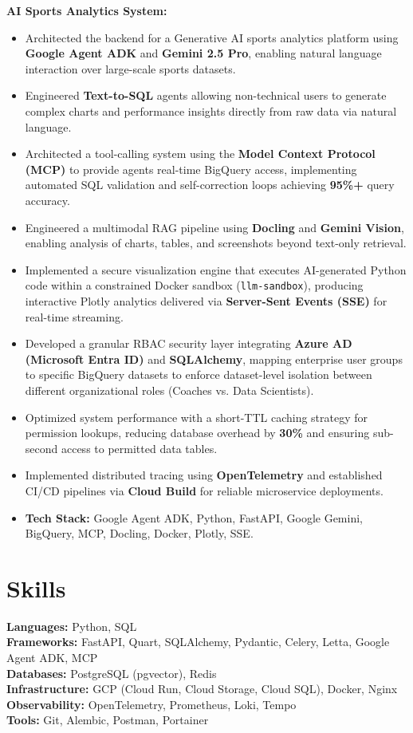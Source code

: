 \documentclass[a4paper,10pt]{article}
\begin{document}
\textbf{AI Sports Analytics System:}
\vspace{0.1cm}
\begin{itemize}[noitemsep,topsep=0pt,leftmargin=*]
    \item Architected the backend for a Generative AI sports analytics platform using \textbf{Google Agent ADK} and \textbf{Gemini 2.5 Pro}, enabling natural language interaction over large-scale sports datasets.
    \item Engineered \textbf{Text-to-SQL} agents allowing non-technical users to generate complex charts and performance insights directly from raw data via natural language.
    \item Architected a tool-calling system using the \textbf{Model Context Protocol (MCP)} to provide agents real-time BigQuery access, implementing automated SQL validation and self-correction loops achieving \textbf{95\%+} query accuracy.
    \item Engineered a multimodal RAG pipeline using \textbf{Docling} and \textbf{Gemini Vision}, enabling analysis of charts, tables, and screenshots beyond text-only retrieval.
    \item Implemented a secure visualization engine that executes AI-generated Python code within a constrained Docker sandbox (\texttt{llm-sandbox}), producing interactive Plotly analytics delivered via \textbf{Server-Sent Events (SSE)} for real-time streaming.
    \item Developed a granular RBAC security layer integrating \textbf{Azure AD (Microsoft Entra ID)} and \textbf{SQLAlchemy}, mapping enterprise user groups to specific BigQuery datasets to enforce dataset-level isolation between different organizational roles (Coaches vs. Data Scientists).
    \item Optimized system performance with a short-TTL caching strategy for permission lookups, reducing database overhead by \textbf{30\%} and ensuring sub-second access to permitted data tables.
    \item Implemented distributed tracing using \textbf{OpenTelemetry} and established CI/CD pipelines via \textbf{Cloud Build} for reliable microservice deployments.
    \item \textbf{Tech Stack:} Google Agent ADK, Python, FastAPI, Google Gemini, BigQuery, MCP, Docling, Docker, Plotly, SSE.
\end{itemize}

\section*{Skills}
\textbf{Languages:} Python, SQL \\
\textbf{Frameworks:} FastAPI, Quart, SQLAlchemy, Pydantic, Celery, Letta, Google Agent ADK, MCP \\
\textbf{Databases:} PostgreSQL (pgvector), Redis \\
\textbf{Infrastructure:} GCP (Cloud Run, Cloud Storage, Cloud SQL), Docker, Nginx \\
\textbf{Observability:} OpenTelemetry, Prometheus, Loki, Tempo \\
\textbf{Tools:} Git, Alembic, Postman, Portainer
\end{document}
